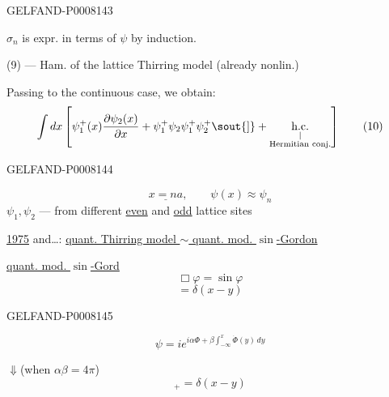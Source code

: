 \begin{GelfandAdjacentEvidence}{GELFAND-P000814}{3}

\(\sigma_n\) is expr. in terms of \(\psi\) by induction.

(9) — Ham. of the lattice Thirring model (already nonlin.)

Passing to the continuous case, we obtain:
\begin{equation*}
\int dx\left[\psi_1^+(x)\frac{\partial\psi_2(x)}{\partial x}
+\psi_1^+\psi_2\psi_1^+\psi_2^+\text{\sout{]}}
+\underset{\substack{\vert\\\text{Hermitian conj.}}}{\text{h.c.}}\right]\tag{10}
\end{equation*}
\end{GelfandAdjacentEvidence}
\begin{GelfandAdjacentEvidence}{GELFAND-P000814}{4}

\[
\underline{x=na},\qquad\psi(x)\approx\psi_n
\]
\(\psi_1,\psi_2\) — from different \uline{even} and \uline{odd} lattice sites

\uline{1975}\qquad {} and\ldots:
\uline{quant. Thirring model \(\sim\) quant. mod. \(\sin\)-Gordon}

\uline{quant. mod. \(\sin\)-Gord}
\begin{equation*}
\Box\varphi=\sin\varphi\tag{11}
\end{equation*}
\begin{equation*}
[\dot\varphi(t,x),\varphi(t,y)]=\delta(x-y)\tag{12}
\end{equation*}
\end{GelfandAdjacentEvidence}
\begin{GelfandAdjacentEvidence}{GELFAND-P000814}{5}

\begin{equation*}
\psi=i e^{i\alpha\Phi+\beta\int_{-\infty}^x\dot\Phi(y)\,dy}\tag{13}
\end{equation*}
\end{GelfandAdjacentEvidence}


\(\Downarrow\)\qquad (when \(\alpha\beta=4\pi\))
\begin{equation*}
[\psi(x),\psi^+(y)]_+=\delta(x-y)\tag{14}
\end{equation*}

